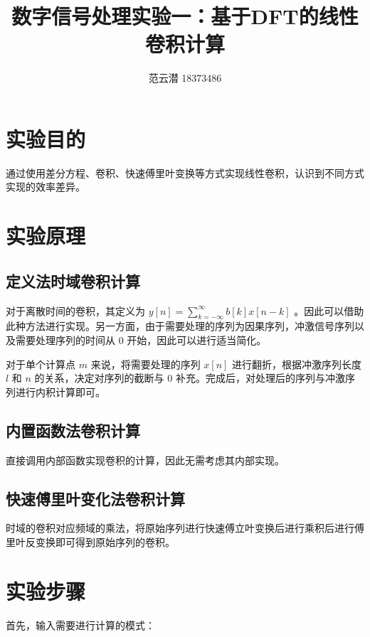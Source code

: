 \documentclass[lang=cn,11pt,a4paper,cite=authoryear]{elegantpaper}
\title{数字信号处理实验一：基于DFT的线性卷积计算}
\author{范云潜 18373486}
\institute{微电子学院 184111 班}
\date{\zhtoday}
\begin{document}
\maketitle


\tableofcontents

\listoffigures

\section{实验目的}

通过使用差分方程、卷积、快速傅里叶变换等方式实现线性卷积，认识到不同方式实现的效率差异。

\section{实验原理}


\subsection{定义法时域卷积计算}

对于离散时间的卷积，其定义为 \(y[n] = \sum_{k = -\infty}^\infty b[k] x[n - k]\) 。因此可以借助此种方法进行实现。另一方面，由于需要处理的序列为因果序列，冲激信号序列以及需要处理序列的时间从 \(0\) 开始，因此可以进行适当简化。

对于单个计算点 \(m\) 来说，将需要处理的序列 \(x[n]\) 进行翻折，根据冲激序列长度 \(l\) 和 \(n\) 的关系，决定对序列的截断与 \(0\) 补充。完成后，对处理后的序列与冲激序列进行内积计算即可。

\subsection{内置函数法卷积计算}

直接调用内部函数实现卷积的计算，因此无需考虑其内部实现。

\subsection{快速傅里叶变化法卷积计算}

时域的卷积对应频域的乘法，将原始序列进行快速傅立叶变换后进行乘积后进行傅里叶反变换即可得到原始序列的卷积。

\section{实验步骤}

首先，输入需要进行计算的模式：
\end{document}
